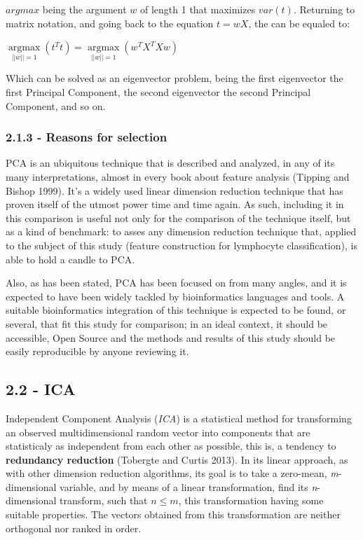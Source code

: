 \documentclass[]{article}
\begin{document}
\(argmax\) being the argument \(w\) of length 1 that maximizes
\(var(t)\). Returning to matrix notation, and going back to the equation
\(t = wX\), the can be equaled to:

\(\underset{||w|| = 1}{\operatorname{argmax}} (t^Tt) = \underset{||w|| = 1}{\operatorname{argmax}} (w^TX^TXw)\)

Which can be solved as an eigenvector problem, being the first
eigenvector the first Principal Component, the second eigenvector the
second Principal Component, and so on.

\subsubsection{2.1.3 - Reasons for
selection}\label{reasons-for-selection}

PCA is an ubiquitous technique that is described and analyzed, in any of
its many interpretations, almost in every book about feature analysis
(Tipping and Bishop 1999). It's a widely used linear dimension reduction
technique that has proven itself of the utmost power time and time
again. As such, including it in this comparison is useful not only for
the comparison of the technique itself, but as a kind of benchmark: to
asses any dimension reduction technique that, applied to the subject of
this study (feature construction for lymphocyte classification), is able
to hold a candle to PCA.

Also, as has been stated, PCA has been focused on from many angles, and
it is expected to have been widely tackled by bioinformatics languages
and tools. A suitable bioinformatics integration of this technique is
expected to be found, or several, that fit this study for comparison; in
an ideal context, it should be accessible, Open Source and the methods
and results of this study should be easily reproducible by anyone
reviewing it.

\subsection{2.2 - ICA}\label{ica}

Independent Component Analysis (\emph{ICA}) is a statistical method for
transforming an observed multidimensional random vector into components
that are statisticaly as independent from each other as possible, this
is, a tendency to \textbf{redundancy reduction} (Tobergte and Curtis
2013). In its linear approach, as with other dimension reduction
algorithms, its goal is to take a zero-mean, \emph{m}-dimensional
variable, and by means of a linear transformation, find its
\emph{n}-dimensional transform, such that \(n \le m\), this
transformation having some suitable properties. The vectors obtained
from this transformation are neither orthogonal nor ranked in order.
\end{document}
